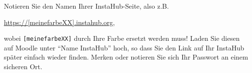 \begin{mysubmission}
  Notieren Sie den Namen Ihrer InstaHub-Seite, also z.B. 
  \begin{center}
    \url{https://[meinefarbeXX].instahub.org},
  \end{center}
  wobei \texttt{[meinefarbeXX]} durch Ihre Farbe ersetzt werden muss! 
  Laden Sie diesen auf Moodle unter \enquote{Name InstaHub} hoch, so dass Sie den Link auf Ihr InstaHub später einfach wieder finden. Merken oder notieren Sie sich Ihr Passwort an einem sicheren Ort.
\end{mysubmission}










